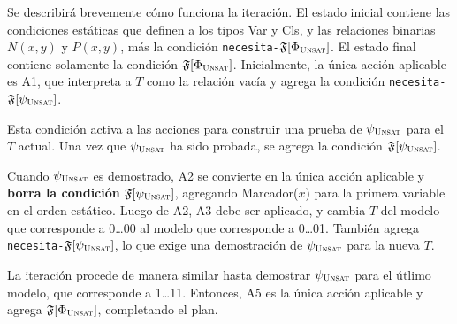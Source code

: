 Se describirá brevemente cómo funciona la iteración.
El estado inicial contiene las condiciones estáticas que definen a los tipos
Var y Cls, y las relaciones binarias 
$N(x,y)$ y $P(x,y)$, más la condición
\texttt{necesita-}$\mathfrak{F}[\Phi_{\textsc{Unsat}}]$. El estado final contiene solamente la
condición $\mathfrak{F}[\Phi_{\textsc{Unsat}}]$.
Inicialmente, la única acción aplicable es A1, que interpreta a $T$ como la
relación vacía y agrega la condición \texttt{necesita-}$\mathfrak{F}[\psi_{\textsc{Unsat}}]$.

Esta condición activa a las acciones para construir una prueba de $\psi_{\textsc{Unsat}}$
para el $T$ actual. Una vez que $\psi_{\textsc{Unsat}}$ ha sido probada, se agrega la
condición $\mathfrak{F}[\psi_{\textsc{Unsat}}]$.

Cuando $\psi_{\textsc{Unsat}}$ es demostrado, A2 se convierte en la única acción
aplicable y \textbf{borra la condición} $\mathfrak{F}[\psi_{\textsc{Unsat}}]$, agregando
Marcador($x$) para la primera variable en el orden estático.
Luego de A2, A3 debe ser aplicado, y cambia $T$ del modelo que corresponde a
0\ldots00 al modelo que corresponde a 0\ldots01. También agrega
\texttt{necesita-}$\mathfrak{F}[\psi_{\textsc{Unsat}}]$, lo que exige una demostración de
$\psi_{\textsc{Unsat}}$ para la nueva $T$.

La iteración procede de manera similar hasta demostrar $\psi_{\textsc{Unsat}}$ para el
útlimo modelo, que corresponde a 1\ldots11. Entonces, A5 es la única acción
aplicable y agrega $\mathfrak{F}[\Phi_{\textsc{Unsat}}]$, completando el plan.

